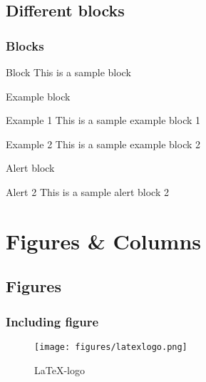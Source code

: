 \documentclass[aspectratio=169]{beamer}
\begin{document}
\subsection{Different blocks}
\begin{frame}
	\frametitle{Blocks}
		\begin{block}{Block}
			This is a sample block
		\end{block}
\end{frame}
\begin{frame}{Example block} %
    \begin{minipage}{0.45\textwidth}
		\begin{exampleblock}{Example 1}
			This is a sample example block 1
		\end{exampleblock}
    \end{minipage}%
    \hfill
    \begin{minipage}{0.45\textwidth}
		\begin{exampleblock}{Example 2}
			This is a sample example block 2
		\end{exampleblock}
    \end{minipage}
\end{frame}
\begin{frame}{Alert block}
    \hfill
     {
        \begin{minipage}{0.45\textwidth}
            \begin{alertblock}{Alert 2}
			         This is a sample alert block 2
		      \end{alertblock}
        \end{minipage}
    }
\end{frame}	

\section{Figures \& Columns}
\subsection{Figures}
\begin{frame}
	\frametitle{Including figure}
	\begin{figure}
		\centering
		\texttt{[image: figures/latexlogo.png]}
		\caption{\LaTeX-logo}
        \citep{stallman1981emacs} %
	\end{figure}
\end{frame}
\end{document}
